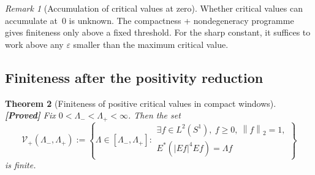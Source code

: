 \documentclass[12pt]{article}
\newtheorem{theorem}{Theorem}[section]
\theoremstyle{definition}
\theoremstyle{remark}
\newtheorem{remark}[theorem]{Remark}
\newcommand{\norm}[1]{\left\|#1\right\|}
\newcommand{\proven}{\textbf{\color{teal}[Proved]}}
\begin{document}
\begin{remark}[Accumulation of critical values at zero]
  \label{rem:accumulation}
  Whether critical values can accumulate at~$0$ is unknown.  The
  compactness + nondegeneracy programme gives finiteness only
  above a fixed threshold.  For the sharp constant, it suffices to
  work above any $\varepsilon$ smaller than the maximum critical
  value.
\end{remark}


\subsection{Finiteness after the positivity reduction}

\begin{theorem}[Finiteness of positive critical values in compact windows]
  \label{thm:positive-values-finite}
  \proven\quad
  Fix $0<\Lambda_-<\Lambda_+<\infty$.  Then the set
  \[
    \mathcal V_+(\Lambda_-,\Lambda_+)
    :=
    \left\{
      \Lambda\in[\Lambda_-,\Lambda_+]:
      \begin{array}{l}
      \exists f\in L^2(S^1),\ f\geq 0,\ \norm{f}_2=1,\\
      E^*(|Ef|^4Ef)=\Lambda f
      \end{array}
    \right\}
  \]
  is finite.
\end{theorem}
\end{document}
